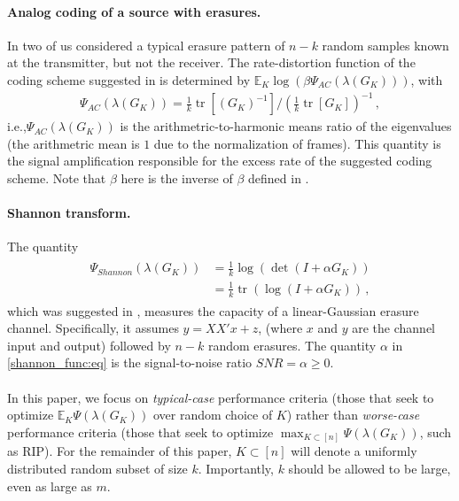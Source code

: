 \documentclass[a4paper,12pt]{article}
\newcommand{\TODO}[1]{ {\tt \color{red} [TODO:#1] } }
\DeclareMathOperator{\tr}{tr}
\newcommand{\E}{\ensuremath{\mathbb{E}}}
\newcommand{\m}{m}
\newcommand{\specstat}{\ensuremath{\Psi}}
\newcommand{\Gk}{\ensuremath{G_K}}
\begin{document}
\paragraph{Analog coding of a source with erasures.} 
In \cite{AnalogCoding} two of us  
considered a typical erasure pattern of
$n-k$ random samples known at the transmitter, but not the receiver.
The rate-distortion function  
of the coding scheme suggested in \cite{AnalogCoding} is determined
by $\E_K \log(\beta\specstat_{AC}(\lambda(\Gk)))$, with
%
\begin{eqnarray} \label{ac_func:eq}
\specstat_{AC}(\lambda(\Gk))=\frac{1}{k}\tr[(\Gk)^{-1}]/\left(\frac{1}{k}\tr[\Gk]\right)^{-1}\,,
\end{eqnarray}
i.e.,$\specstat_{AC}(\lambda(\Gk))$ is the arithmetric-to-harmonic means ratio of the eigenvalues (the arithmetric mean is $1$ due to the normalization of frames). This quantity is the signal
amplification responsible for the excess rate of the suggested coding scheme. Note that $\beta$ here is the inverse of $\beta$ defined in \cite{AnalogCoding}.  %
% 
\paragraph{Shannon transform.} 
The quantity 
\begin{eqnarray} \label{shannon_func:eq}
\begin{aligned}
\specstat_{Shannon}(\lambda(\Gk)) 
&= \frac{1}{k}\log(\det(I+\alpha \Gk))\\
&= \frac{1}{k}\tr(\log(I+\alpha \Gk))\,,
\end{aligned}
\end{eqnarray}
which was suggested in \cite{RandomMatrix},
measures the capacity of a linear-Gaussian erasure channel. 
Specifically, it assumes $y=XX'x+z$,
(where $x$ and $y$ are the channel input and output)
followed by $n-k$ random erasures. %
The quantity $\alpha$ in \eqref{shannon_func:eq} is the 
signal-to-noise ratio $SNR=\alpha\geq 0$.
\\
~
\\
\noindent In this paper, we focus on {\em typical-case} performance criteria (those that
seek to optimize $\E_K \specstat(\lambda(\Gk))$ over random choice of $K$) rather than
{\em worse-case} performance criteria (those that seek to optimize 
$\max_{K\subset [n]} \specstat(\lambda(\Gk))$, such as RIP). For the remainder of this
paper, $K\subset[n]$ will denote a uniformly distributed random subset of size
$k$. Importantly, $k$ should be allowed to be large, even as large as $\m$. 
\end{document}

